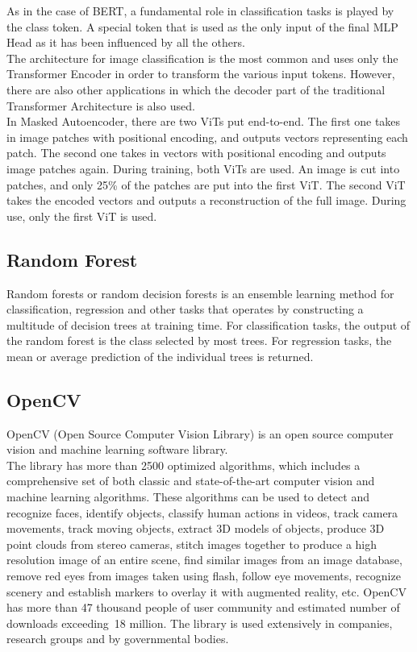 As in the case of BERT, a fundamental role in classification tasks is played by the class token. A special token that is used as the only input of the final MLP Head as it has been influenced by all the others.
\\

The architecture for image classification is the most common and uses only the Transformer Encoder in order to transform the various input tokens. However, there are also other applications in which the decoder part of the traditional Transformer Architecture is also used.
\\

In Masked Autoencoder, there are two ViTs put end-to-end. The first one takes in image patches with positional encoding, and outputs vectors representing each patch. The second one takes in vectors with positional encoding and outputs image patches again. During training, both ViTs are used. An image is cut into patches, and only 25\% of the patches are put into the first ViT. The second ViT takes the encoded vectors and outputs a reconstruction of the full image. During use, only the first ViT is used.
\\

\subsection{\textbf{Random Forest}}
\cite{RF}
Random forests or random decision forests is an ensemble learning method for classification, regression and other tasks that operates by constructing a multitude of decision trees at training time. For classification tasks, the output of the random forest is the class selected by most trees. For regression tasks, the mean or average prediction of the individual trees is returned. \\

\subsection{\textbf{OpenCV}}
\cite{opencv} OpenCV (Open Source Computer Vision Library) is an open source computer vision and machine learning software library.
\\

The library has more than 2500 optimized algorithms, which includes a comprehensive set of both classic and state-of-the-art computer vision and machine learning algorithms. These algorithms can be used to detect and recognize faces, identify objects, classify human actions in videos, track camera movements, track moving objects, extract 3D models of objects, produce 3D point clouds from stereo cameras, stitch images together to produce a high resolution image of an entire scene, find similar images from an image database, remove red eyes from images taken using flash, follow eye movements, recognize scenery and establish markers to overlay it with augmented reality, etc. OpenCV has more than 47 thousand people of user community and estimated number of downloads exceeding 18 million. The library is used extensively in companies, research groups and by governmental bodies.
\\

